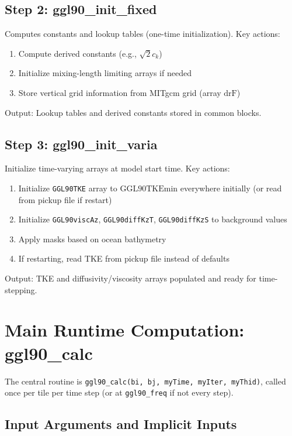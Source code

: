 \documentclass[11pt, a4paper]{article}
\begin{document}
\subsection{Step 2: ggl90\_init\_fixed}

Computes constants and lookup tables (one-time initialization). Key actions:

\begin{enumerate}
    \item Compute derived constants (e.g., $\sqrt{2}c_k$)
    \item Initialize mixing-length limiting arrays if needed
    \item Store vertical grid information from MITgcm grid (array $\text{drF}$)
\end{enumerate}

Output: Lookup tables and derived constants stored in common blocks.

\subsection{Step 3: ggl90\_init\_varia}

Initialize time-varying arrays at model start time. Key actions:

\begin{enumerate}
    \item Initialize \texttt{GGL90TKE} array to $\text{GGL90TKEmin}$ everywhere initially (or read from pickup file if restart)
    \item Initialize \texttt{GGL90viscAz}, \texttt{GGL90diffKzT}, \texttt{GGL90diffKzS} to background values
    \item Apply masks based on ocean bathymetry
    \item If restarting, read TKE from pickup file instead of defaults
\end{enumerate}

Output: TKE and diffusivity/viscosity arrays populated and ready for time-stepping.

\section{Main Runtime Computation: ggl90\_calc}

The central routine is \texttt{ggl90\_calc(bi, bj, myTime, myIter, myThid)}, called once per tile per time step (or at \texttt{ggl90\_freq} if not every step).

\subsection{Input Arguments and Implicit Inputs}
\end{document}
